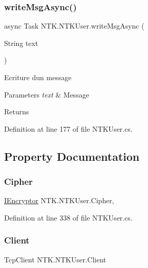 \subsubsection{\texorpdfstring{writeMsgAsync()}{writeMsgAsync()}}
{\footnotesize\ttfamily async Task N\+T\+K.\+N\+T\+K\+User.\+write\+Msg\+Async (\begin{DoxyParamCaption}\item[{String}]{text }\end{DoxyParamCaption})}



Ecriture d\textquotesingle{}un message 


\begin{DoxyParams}{Parameters}
{\em text} & Message\\
\hline
\end{DoxyParams}
\begin{DoxyReturn}{Returns}

\end{DoxyReturn}


Definition at line 177 of file N\+T\+K\+User.\+cs.



\subsection{Property Documentation}
\mbox{\label{class_n_t_k_1_1_n_t_k_user_a00902f61177d6afd6635230413584228}} 
\subsubsection{\texorpdfstring{Cipher}{Cipher}}
{\footnotesize\ttfamily \mbox{\hyperlink{interface_n_t_k_1_1_security_1_1_i_encryptor}{I\+Encryptor}} N\+T\+K.\+N\+T\+K\+User.\+Cipher\hspace{0.3cm}{\ttfamily [get]}, {\ttfamily [set]}}







Definition at line 338 of file N\+T\+K\+User.\+cs.

\mbox{\label{class_n_t_k_1_1_n_t_k_user_a42060ca18fc5a6d1c1c2afd366b4ba3d}} 
\subsubsection{\texorpdfstring{Client}{Client}}
{\footnotesize\ttfamily Tcp\+Client N\+T\+K.\+N\+T\+K\+User.\+Client\hspace{0.3cm}{\ttfamily [get]}}







